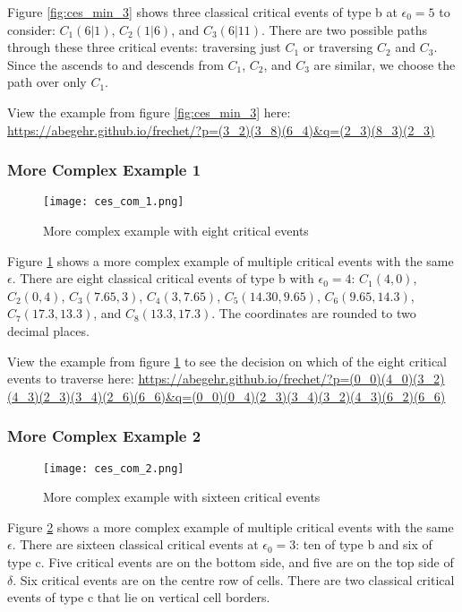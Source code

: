 Figure \ref{fig:ces_min_3} shows three classical critical events of type b at $\epsilon_0 = 5$ to consider: $C_1(6|1)$, $C_2(1|6)$, and $C_3(6|11)$. There are two possible paths through these three critical events: traversing just $C_1$ or traversing $C_2$ and $C_3$. Since the ascends to and descends from $C_1$, $C_2$, and $C_3$ are similar, we choose the path over only $C_1$.

View the example from figure \ref{fig:ces_min_3} here: \url{https://abegehr.github.io/frechet/?p=(3_2)(3_8)(6_4)&q=(2_3)(8_3)(2_3)}


\subsubsection{More Complex Example 1}

\begin{figure}[H]
    \centering
    
    \texttt{[image: ces\_com\_1.png]}
		
	\caption{More complex example with eight critical events}
    \label{fig:ces_com_1}
\end{figure}

Figure \ref{fig:ces_com_1} shows a more complex example of multiple critical events with the same $\epsilon$. There are eight classical critical events of type b with $\epsilon_0 = 4$: $C_1(4, 0)$, $C_2(0, 4)$, $C_3(7.65, 3)$, $C_4(3, 7.65)$, $C_5(14.30, 9.65)$, $C_6(9.65, 14.3)$, $C_7(17.3, 13.3)$, and $C_8(13.3, 17.3)$. The coordinates are rounded to two decimal places. 

View the example from figure \ref{fig:ces_com_1} to see the decision on which of the eight critical events to traverse here: \url{https://abegehr.github.io/frechet/?p=(0_0)(4_0)(3_2)(4_3)(2_3)(3_4)(2_6)(6_6)&q=(0_0)(0_4)(2_3)(3_4)(3_2)(4_3)(6_2)(6_6)}


\subsubsection{More Complex Example 2}

\begin{figure}[H]
    \centering
    
    \texttt{[image: ces\_com\_2.png]}
		
	\caption{More complex example with sixteen critical events}
    \label{fig:ces_com_2}
\end{figure}

Figure \ref{fig:ces_com_2} shows a more complex example of multiple critical events with the same $\epsilon$. There are sixteen classical critical events at $\epsilon_0 = 3$: ten of type b and six of type c. Five critical events are on the bottom side, and five are on the top side of $\delta$. Six critical events are on the centre row of cells. There are two classical critical events of type c that lie on vertical cell borders.

